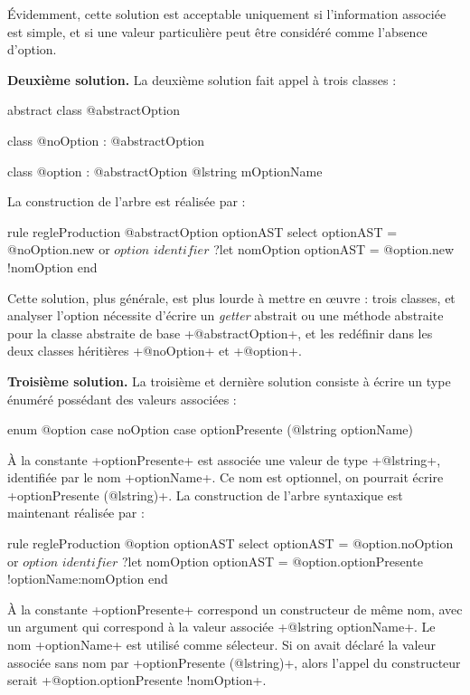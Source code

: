Évidemment, cette solution est acceptable uniquement si l'information associée est simple, et si une valeur particulière peut être considéré comme l'absence d'option.

\textbf{Deuxième solution.} La deuxième solution fait appel à trois classes :
\begin{galgas}
abstract class @abstractOption {}

class @noOption : @abstractOption {}

class @option : @abstractOption { @lstring mOptionName }
\end{galgas}

La construction de l'arbre est réalisée par :
\begin{galgas}
rule regleProduction {
  @abstractOption optionAST
  select
    optionAST = @noOption.new
  or
    $option$
    $identifier$ ?let nomOption
    optionAST = @option.new {!nomOption}
  end
}
\end{galgas}

Cette solution, plus générale, est plus lourde à mettre en œuvre : trois classes, et analyser l'option nécessite d'écrire un \emph{getter} abstrait ou une méthode abstraite pour la classe abstraite de base \ggs+@abstractOption+, et les redéfinir dans les deux classes héritières \ggs+@noOption+ et \ggs+@option+.

\textbf{Troisième solution.} La troisième et dernière solution consiste à écrire un type énuméré possédant des valeurs associées :

\begin{galgas}
enum @option {
  case noOption
  case optionPresente (@lstring optionName)
}
\end{galgas}

À la constante \ggs+optionPresente+ est associée une valeur de type \ggs+@lstring+, identifiée par le nom \ggs+optionName+. Ce nom est optionnel, on pourrait écrire \ggs+optionPresente (@lstring)+. La construction de l'arbre syntaxique est maintenant réalisée par :
\begin{galgas}
rule regleProduction {
  @option optionAST
  select
    optionAST = @option.noOption
  or
    $option$
    $identifier$ ?let nomOption
    optionAST = @option.optionPresente {!optionName:nomOption}
  end
}
\end{galgas}

À la constante \ggs+optionPresente+ correspond un constructeur de même nom, avec un argument qui correspond à la valeur associée \ggs+@lstring optionName+. Le nom \ggs+optionName+ est utilisé comme sélecteur. Si on avait déclaré la valeur associée sans nom par \ggs+optionPresente (@lstring)+, alors l'appel du constructeur serait \ggs+@option.optionPresente {!nomOption}+.

